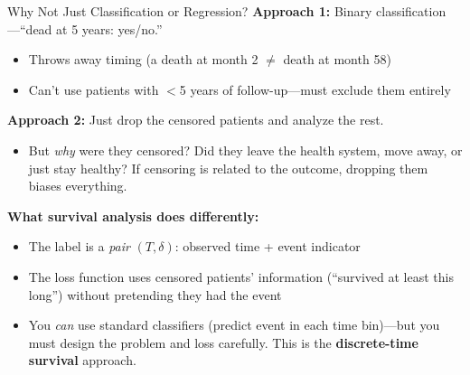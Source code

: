 \documentclass[aspectratio=169,10pt]{beamer}
\begin{document}
\begin{frame}{Why Not Just Classification or Regression?}
\textbf{Approach 1:} Binary classification---``dead at 5 years: yes/no.''
\begin{itemize}
    \item Throws away timing (a death at month 2 $\neq$ death at month 58)
    \item Can't use patients with $<$5 years of follow-up---must exclude them entirely
\end{itemize}

\vspace{0.2em}
\textbf{Approach 2:} Just drop the censored patients and analyze the rest.
\begin{itemize}
    \item But \emph{why} were they censored? Did they leave the health system, move away, or just stay healthy? If censoring is related to the outcome, dropping them biases everything.
\end{itemize}

\vspace{0.2em}
\pause
\textbf{What survival analysis does differently:}
\begin{itemize}
    \item The label is a \emph{pair} $(T, \delta)$: observed time + event indicator
    \item The loss function uses censored patients' information (``survived at least this long'') without pretending they had the event
    \item You \emph{can} use standard classifiers (predict event in each time bin)---but you must design the problem and loss carefully. This is the \textbf{discrete-time survival} approach.
\end{itemize}
\end{frame}
\end{document}
